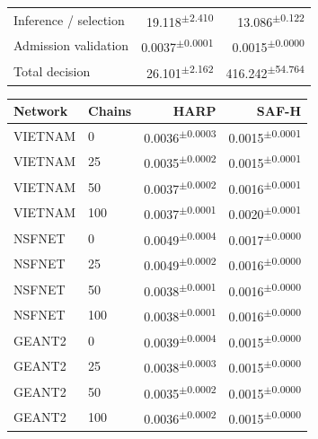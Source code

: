 \documentclass[final,5p]{elsarticle}
\begin{document}
\begin{table}[p]
\begin{minipage}[t]{0.49\textwidth}
{{\begin{tabular}{lrr}
Inference / selection & 19.118\textsuperscript{$\pm$2.410} & 13.086\textsuperscript{$\pm$0.122} \\
Admission validation & 0.0037\textsuperscript{$\pm$0.0001} & 0.0015\textsuperscript{$\pm$0.0000} \\
Total decision & 26.101\textsuperscript{$\pm$2.162} & 416.242\textsuperscript{$\pm$54.764} \\
\bottomrule
\end{tabular}}}
\end{minipage}\hfill
\begin{minipage}[t]{0.49\textwidth}
\scriptsize
{\color{revisiongreen}
\begin{tabular}{llrr}
\toprule
Network & Chains & HARP & SAF-H \\
\midrule
VIETNAM & 0 & 0.0036\textsuperscript{$\pm$0.0003} & 0.0015\textsuperscript{$\pm$0.0001} \\
VIETNAM & 25 & 0.0035\textsuperscript{$\pm$0.0002} & 0.0015\textsuperscript{$\pm$0.0001} \\
VIETNAM & 50 & 0.0037\textsuperscript{$\pm$0.0002} & 0.0016\textsuperscript{$\pm$0.0001} \\
VIETNAM & 100 & 0.0037\textsuperscript{$\pm$0.0001} & 0.0020\textsuperscript{$\pm$0.0001} \\
NSFNET & 0 & 0.0049\textsuperscript{$\pm$0.0004} & 0.0017\textsuperscript{$\pm$0.0000} \\
NSFNET & 25 & 0.0049\textsuperscript{$\pm$0.0002} & 0.0016\textsuperscript{$\pm$0.0000} \\
NSFNET & 50 & 0.0038\textsuperscript{$\pm$0.0001} & 0.0016\textsuperscript{$\pm$0.0000} \\
NSFNET & 100 & 0.0038\textsuperscript{$\pm$0.0001} & 0.0016\textsuperscript{$\pm$0.0000} \\
GEANT2 & 0 & 0.0039\textsuperscript{$\pm$0.0004} & 0.0015\textsuperscript{$\pm$0.0000} \\
GEANT2 & 25 & 0.0038\textsuperscript{$\pm$0.0003} & 0.0015\textsuperscript{$\pm$0.0000} \\
GEANT2 & 50 & 0.0035\textsuperscript{$\pm$0.0002} & 0.0015\textsuperscript{$\pm$0.0000} \\
GEANT2 & 100 & 0.0036\textsuperscript{$\pm$0.0002} & 0.0015\textsuperscript{$\pm$0.0000} \\
\bottomrule
\end{tabular}}
\end{minipage}
\end{table}
\end{document}
